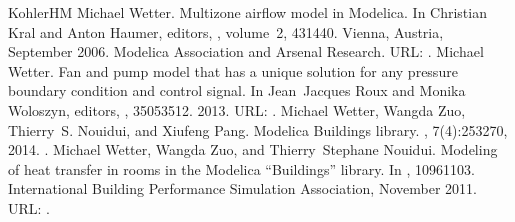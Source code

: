 \documentclass[letterpaper,10pt, openany,english]{sphinxmanual}
\begin{document}
\begin{sphinxthebibliography}{KohlerHM}
Michael Wetter. Multizone airflow model in Modelica. In Christian Kral and Anton Haumer, editors, , volume 2, 431\textendash{}440. Vienna, Austria, September 2006. Modelica Association and Arsenal Research. URL: .
Michael Wetter. Fan and pump model that has a unique solution for any pressure boundary condition and control signal. In Jean Jacques Roux and Monika Woloszyn, editors, , 3505\textendash{}3512. 2013. URL: .
Michael Wetter, Wangda Zuo, Thierry S. Nouidui, and Xiufeng Pang. Modelica Buildings library. , 7(4):253\textendash{}270, 2014. .
Michael Wetter, Wangda Zuo, and Thierry Stephane Nouidui. Modeling of heat transfer in rooms in the Modelica “Buildings” library. In , 1096\textendash{}1103. International Building Performance Simulation Association, November 2011. URL: .
\end{sphinxthebibliography}



\renewcommand{\indexname}{Index}
\printindex
\end{document}
